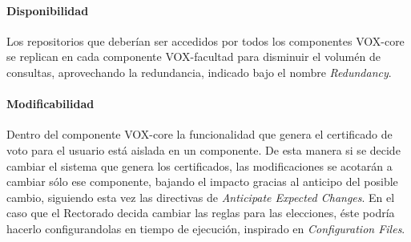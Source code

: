 \paragraph{Disponibilidad}
Los repositorios que deberían ser accedidos por todos los componentes VOX-core se replican en cada componente VOX-facultad para disminuir el volumén de consultas, aprovechando la redundancia, indicado bajo el nombre \textit{Redundancy}.

\paragraph{Modificabilidad}
Dentro del componente VOX-core la funcionalidad que genera el certificado de voto para el usuario está aislada en un componente. De esta manera si se decide cambiar el sistema que genera los certificados, las modificaciones se acotarán a cambiar sólo ese componente, bajando el impacto gracias al anticipo del posible cambio, siguiendo esta vez las directivas de \textit{Anticipate Expected Changes}. En el caso que el Rectorado decida cambiar las reglas para las elecciones, éste podría hacerlo configurandolas en tiempo de ejecución, inspirado en \textit{Configuration Files}.


